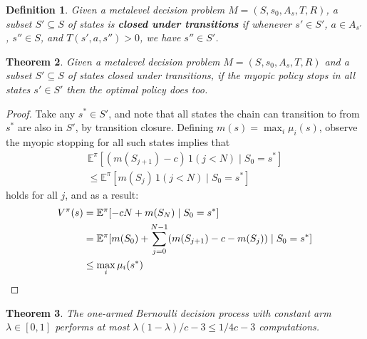 \documentclass[]{article}
\newcommand {\IE} {\ensuremath {\mathbb{E}}}
\newcommand {\term}[1] {\textbf{#1}}
\newcommand {\given} {\mid} %
\newtheorem{thm}{Theorem}
\newtheorem{dfn}[thm]{Definition}
\begin{document}
	\begin{dfn}\label{dfn:closed}
		Given a metalevel decision problem $M=(S,s_0,A_s,T,R)$,
		a subset $S'\subseteq S$ of states is \term{closed under transitions}
		if whenever $s'\in S'$, $a\in A_{s'}$, $s''\in S$, and $T(s',a,s'')>0$,
		we have $s''\in S'$.
	\end{dfn}

	\begin{thm}\label{thm:myopic-optimal}
		Given a metalevel decision problem $M=(S,s_0,A_s,T,R)$
		and a subset $S'\subseteq S$ of states closed under transitions,	
		if the myopic policy stops in all states $s'\in S'$
		then the optimal policy does too.	
	\end{thm}

	\begin{hiddenproof}
		\begin{proof}
		Take any $s^*\in S'$, and note that all states the chain can transition
		to from $s^*$ are also in $S'$, by transition closure.  Defining $m(s) = \max_i\mu_i(s)$, 
		observe the myopic stopping for all such states implies that
		\begin{align*}
			\IE^{\pi}[(m(S_{j+1}) - c)\, 1(j<N)\given S_0=s^*] \\
			\le \IE^{\pi}[m(S_{j})\, 1(j<N)\given S_0=s^*]
		\end{align*}
		holds for all $j$, and as a result:
		\begin{align*}
			V^\pi(s) 
			&= \IE^{\pi}[ - c N + m(S_N) \given S_0=s^*] \\
			&= \IE^{\pi}[m(S_0) + \sum_{j=0}^{N-1} (m(S_{j+1}) - c - m(S_j)) \given S_0=s^*] \\
			&\le \max_i\mu_i(s^*) \qedhere
		\end{align*}
		\end{proof}	
	\end{hiddenproof}

	\begin{thm}\label{thm:one-action-bound}
		The one-armed Bernoulli decision process with constant arm $\lambda\in[0,1]$ 
		performs at most $\lambda(1-\lambda)/c-3 \le 1/4c-3$ computations.
	\end{thm}
   
\end{document}
